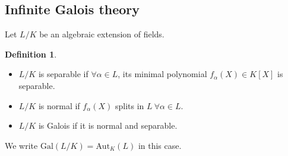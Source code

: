 \documentclass{article}
\theoremstyle{definition}
\newtheorem{defn}{Definition}[section]
\begin{document}
\subsection{Infinite Galois theory}
Let $L/K$ be an algebraic extension of fields.
\begin{defn}
    \begin{itemize}
        \item $L/K$ is separable if $\forall \alpha \in L$, its minimal polynomial $f_\alpha(X) \in K[X]$ is separable.
        \item $L/K$ is normal if $f_{\alpha}(X)$ splits in $L ~\forall \alpha \in L$.
        \item $L/K$ is Galois if it is normal and separable.
    \end{itemize}
\end{defn}
We write $\text{Gal}(L/K) = \text{Aut}_K(L)$ in this case.
\vspace{1mm}
 
\end{document}
